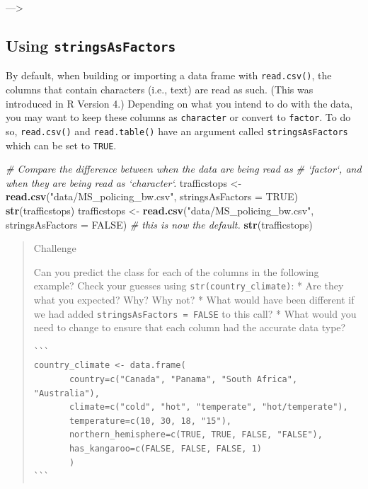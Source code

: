 \documentclass[
]{book}
\newenvironment{Shaded}{\begin{snugshade}}{\end{snugshade}}
\newcommand{\CommentTok}[1]{\textcolor[rgb]{0.56,0.35,0.01}{\textit{#1}}}
\newcommand{\DataTypeTok}[1]{\textcolor[rgb]{0.13,0.29,0.53}{#1}}
\newcommand{\KeywordTok}[1]{\textcolor[rgb]{0.13,0.29,0.53}{\textbf{#1}}}
\newcommand{\NormalTok}[1]{#1}
\newcommand{\OtherTok}[1]{\textcolor[rgb]{0.56,0.35,0.01}{#1}}
\newcommand{\StringTok}[1]{\textcolor[rgb]{0.31,0.60,0.02}{#1}}
\begin{document}
---\textgreater{}

\hypertarget{using-stringsasfactors}{%
\subsection{\texorpdfstring{Using \texttt{stringsAsFactors}}{Using stringsAsFactors}}\label{using-stringsasfactors}}

By default, when building or importing a data frame with \texttt{read.csv()}, the columns that contain characters (i.e., text) are read as such. (This was introduced in R Version 4.) Depending on what you intend to do with the data, you may want to keep these
columns as \texttt{character} or convert to \texttt{factor}. To do so, \texttt{read.csv()} and \texttt{read.table()} have an
argument called \texttt{stringsAsFactors} which can be set to \texttt{TRUE}.

\begin{Shaded}
\begin{Highlighting}[]
\CommentTok{# Compare the difference between when the data are being read as}
\CommentTok{# `factor`, and when they are being read as `character`.}
\NormalTok{trafficstops <-}\StringTok{ }\KeywordTok{read.csv}\NormalTok{(}\StringTok{"data/MS_policing_bw.csv"}\NormalTok{, }\DataTypeTok{stringsAsFactors =} \OtherTok{TRUE}\NormalTok{)}
\KeywordTok{str}\NormalTok{(trafficstops)}
\NormalTok{trafficstops <-}\StringTok{ }\KeywordTok{read.csv}\NormalTok{(}\StringTok{"data/MS_policing_bw.csv"}\NormalTok{, }\DataTypeTok{stringsAsFactors =} \OtherTok{FALSE}\NormalTok{) }\CommentTok{# this is now the default.}
\KeywordTok{str}\NormalTok{(trafficstops) }
\end{Highlighting}
\end{Shaded}

\begin{quote}
Challenge

Can you predict the class for each of the columns in the following example?
Check your guesses using \texttt{str(country\_climate)}:
* Are they what you expected? Why? Why not?
* What would have been different if we had added \texttt{stringsAsFactors\ =\ FALSE} to this call?
* What would you need to change to ensure that each column had the accurate data type?

\begin{verbatim}
```
country_climate <- data.frame(
       country=c("Canada", "Panama", "South Africa", "Australia"),
       climate=c("cold", "hot", "temperate", "hot/temperate"),
       temperature=c(10, 30, 18, "15"),
       northern_hemisphere=c(TRUE, TRUE, FALSE, "FALSE"),
       has_kangaroo=c(FALSE, FALSE, FALSE, 1)
       )
```
\end{verbatim}
\end{quote}
\end{document}

